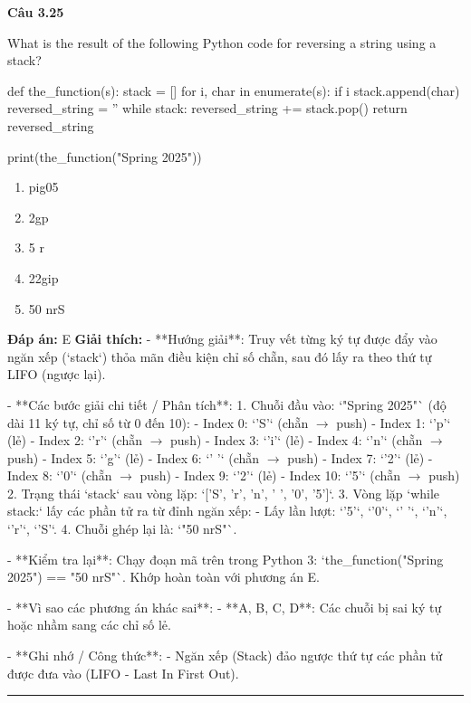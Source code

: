 \documentclass[11pt,a4paper]{article}
\newenvironment{question}[1]{%
  \par\vspace{1em}\noindent\textbf{\large Câu #1}\par\vspace{0.4em}
}{%
  \par\vspace{1em}\hrule\vspace{0.6em}
}
\newenvironment{choices}{%
  \begin{enumerate}[label=\textbf{\Alph*.},leftmargin=2.2em,itemsep=2pt,topsep=3pt]
}{%
  \end{enumerate}
}
\newcommand{\choice}{\item}
\newenvironment{codebox}{%
  \begin{tcolorbox}[colback=gray!8!white,colframe=gray!50!black,arc=1.5mm,boxrule=0.6pt,left=3mm,right=3mm,top=2.5mm,bottom=2.5mm]
  \ttfamily\small
}{%
  \end{tcolorbox}
}
\begin{document}
\begin{question}{3.25}
What is the result of the following Python code for reversing a string using a stack?
\begin{codebox}
def the_function(s):
    stack = []
    for i, char in enumerate(s):
        if i %
            stack.append(char)
    reversed_string = ''
    while stack:
        reversed_string += stack.pop()
    return reversed_string

print(the_function("Spring 2025"))
\end{codebox}
\begin{choices}
\choice pig05
\choice 2gp
\choice 5 r
\choice 22gip
\choice 50 nrS
\end{choices}
\textbf{Đáp án:} E
\textbf{Giải thích:} - **Hướng giải**:
  Truy vết từng ký tự được đẩy vào ngăn xếp (`stack`) thỏa mãn điều kiện chỉ số chẵn, sau đó lấy ra theo thứ tự LIFO (ngược lại).

- **Các bước giải chi tiết / Phân tích**:
  1. Chuỗi đầu vào: `"Spring 2025"` (độ dài 11 ký tự, chỉ số từ 0 đến 10):
     - Index 0: `'S'` (chẵn \(\rightarrow\) push)
     - Index 1: `'p'` (lẻ)
     - Index 2: `'r'` (chẵn \(\rightarrow\) push)
     - Index 3: `'i'` (lẻ)
     - Index 4: `'n'` (chẵn \(\rightarrow\) push)
     - Index 5: `'g'` (lẻ)
     - Index 6: `' '` (chẵn \(\rightarrow\) push)
     - Index 7: `'2'` (lẻ)
     - Index 8: `'0'` (chẵn \(\rightarrow\) push)
     - Index 9: `'2'` (lẻ)
     - Index 10: `'5'` (chẵn \(\rightarrow\) push)
  2. Trạng thái `stack` sau vòng lặp: `['S', 'r', 'n', ' ', '0', '5']`.
  3. Vòng lặp `while stack:` lấy các phần tử ra từ đỉnh ngăn xếp:
     - Lấy lần lượt: `'5'`, `'0'`, `' '`, `'n'`, `'r'`, `'S'`.
  4. Chuỗi ghép lại là: `"50 nrS"`.

- **Kiểm tra lại**:
  Chạy đoạn mã trên trong Python 3:
  `the_function("Spring 2025") == "50 nrS"`.
  Khớp hoàn toàn với phương án E.

- **Vì sao các phương án khác sai**:
  - **A, B, C, D**: Các chuỗi bị sai ký tự hoặc nhầm sang các chỉ số lẻ.

- **Ghi nhớ / Công thức**:
  - Ngăn xếp (Stack) đảo ngược thứ tự các phần tử được đưa vào (LIFO - Last In First Out).
\end{question}
\end{document}
